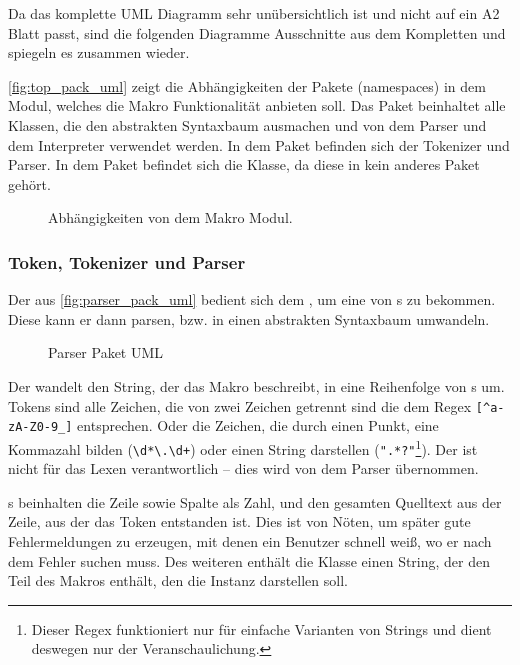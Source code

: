     Da das komplette UML Diagramm sehr unübersichtlich ist und nicht auf ein A2 Blatt passt, sind die folgenden Diagramme Ausschnitte aus dem Kompletten und spiegeln es zusammen wieder.

    \autoref{fig:top_pack_uml} zeigt die Abhängigkeiten der Pakete (namespaces) in dem Modul, welches die Makro Funktionalität anbieten soll. Das  Paket beinhaltet alle Klassen, die den abstrakten Syntaxbaum ausmachen und von dem Parser und dem Interpreter verwendet werden. In dem  Paket befinden sich der Tokenizer und Parser. In dem  Paket befindet sich die  Klasse, da diese in kein anderes Paket gehört.
    \begin{figure}[H]
      \centering
      \caption{Abhängigkeiten von dem Makro Modul.}
      \label{fig:top_pack_uml}
    \end{figure}

    \subsubsection{Token, Tokenizer und Parser}
    \label{sssec:Token, Tokenizer und Parser}
      Der  aus \autoref{fig:parser_pack_uml} bedient sich dem , um eine  von s zu bekommen. Diese  kann er dann parsen, bzw. in einen abstrakten Syntaxbaum umwandeln.
      \begin{figure}[H]
        \centering
        \caption{Parser Paket UML}
        \label{fig:parser_pack_uml}
      \end{figure}

      Der  wandelt den String, der das Makro beschreibt, in eine Reihenfolge von s um. Tokens sind alle Zeichen, die von zwei Zeichen getrennt sind die dem Regex \lstinline$[^a-zA-Z0-9_]$ entsprechen. Oder die Zeichen, die durch einen Punkt, eine
      Kommazahl bilden (\lstinline$\d*\.\d+$) oder einen String darstellen (\lstinline$".*?"$\footnote{
        Dieser Regex funktioniert nur für einfache Varianten von Strings und dient deswegen nur der Veranschaulichung.
      }). Der  ist nicht für das Lexen verantwortlich -- dies wird von dem Parser übernommen.

      s beinhalten die Zeile sowie Spalte als Zahl, und den gesamten Quelltext aus der Zeile, aus der das Token entstanden ist. Dies ist von Nöten, um später gute Fehlermeldungen zu erzeugen, mit denen ein Benutzer schnell weiß, wo er nach dem Fehler suchen muss. Des weiteren enthält die Klasse einen String, der den Teil des Makros enthält, den die Instanz darstellen soll.


